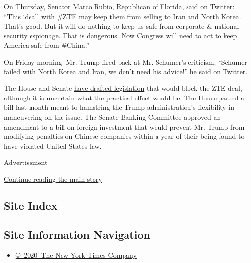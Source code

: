 On Thursday, Senator Marco Rubio, Republican of Florida,
\href{https://twitter.com/marcorubio/status/1004725599074770944}{said on
Twitter}: ``This `deal' with \#ZTE may keep them from selling to Iran
and North Korea. That's good. But it will do nothing to keep us safe
from corporate \& national security espionage. That is dangerous. Now
Congress will need to act to keep America safe from \#China.''

On Friday morning, Mr. Trump fired back at Mr. Schumer's criticism.
``Schumer failed with North Korea and Iran, we don't need his advice!''
\href{https://twitter.com/realDonaldTrump/status/1005028243760611328}{he
said on Twitter}.

The House and Senate
\href{https://www.nytimes.com/2018/05/24/us/politics/trump-zte-china.html}{have
drafted legislation} that would block the ZTE deal, although it is
uncertain what the practical effect would be. The House passed a bill
last month meant to hamstring the Trump administration's flexibility in
maneuvering on the issue. The Senate Banking Committee approved an
amendment to a bill on foreign investment that would prevent Mr. Trump
from modifying penalties on Chinese companies within a year of their
being found to have violated United States law.

Advertisement

\protect\hyperlink{after-bottom}{Continue reading the main story}

\hypertarget{site-index}{%
\subsection{Site Index}\label{site-index}}

\hypertarget{site-information-navigation}{%
\subsection{Site Information
Navigation}\label{site-information-navigation}}

\begin{itemize}
\tightlist
\item
  \href{https://help.nytimes.com/hc/en-us/articles/115014792127-Copyright-notice}{©~2020~The
  New York Times Company}
\end{itemize}

